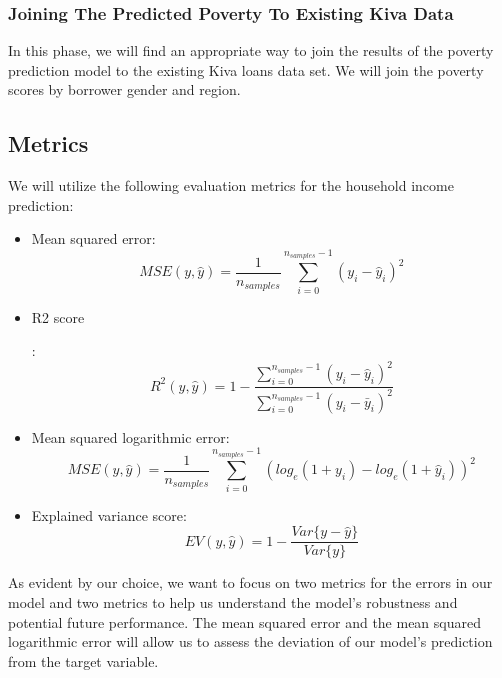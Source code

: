 \documentclass{article}
\begin{document}
\subsubsection{Joining The Predicted Poverty To Existing Kiva Data}
In this phase, we will find an appropriate way to join the results of the poverty prediction model to the existing Kiva loans data set. We will join the poverty scores by borrower gender and region.
\hypertarget{metrics}{\subsection{Metrics}}
We will utilize the following evaluation metrics for the household income prediction:
\begin{itemize}
  \item Mean squared error:
    \begin{equation}
      MSE(y, \hat{y}) = \frac{1}{n_{samples}}\sum_{i=0}^{n_{samples} - 1}(y_i - \hat{y}_i)^2
    \end{equation}
  \item \hypertarget{r2score}{R2 score}:
    \begin{equation}
      R^2(y, \hat{y}) = 1 - \frac{\sum_{i=0}^{n_{samples} - 1}(y_i - \hat{y}_i)^2}{\sum_{i=0}^{n_{samples} - 1}(y_i - \bar{y}_i)^2}
    \end{equation}
  \item Mean squared logarithmic error:
    \begin{equation}
      MSE(y, \hat{y}) = \frac{1}{n_{samples}}\sum_{i=0}^{n_{samples} - 1}(log_e(1 + y_i) - log_e(1 + \hat{y}_i))^2
    \end{equation}
  \item Explained variance score:
    \begin{equation}
      EV(y, \hat{y}) = 1 - \frac{Var\{y - \hat{y}\}}{Var\{y\}}
    \end{equation}
\end{itemize}

As evident by our choice, we want to focus on two metrics for the errors in our model and two metrics to help us understand the model's robustness and potential future performance. The mean squared error and the mean squared logarithmic error will allow us to assess the deviation of our model's prediction from the target variable.
\end{document}
